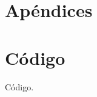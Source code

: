 \chapter*{Apéndices}
\label{Apendices}

\appendix
\chapter{Código}
\label{Código}


Código.

\begin{verbatim}

\end{verbatim}
